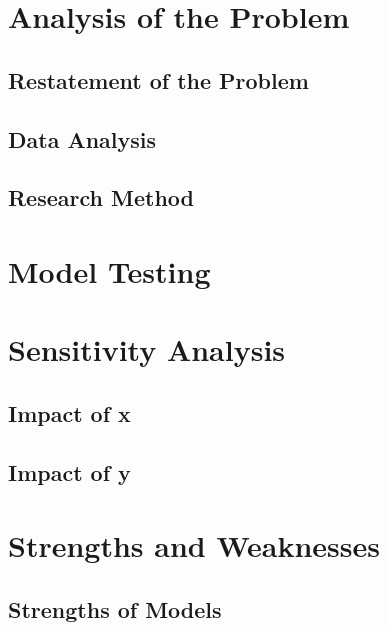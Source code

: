 \documentclass{mcmthesis}
\begin{document}
\section{Analysis of the Problem}
\subsection{Restatement of the Problem}
\subsection{Data Analysis}
\subsection{Research Method}








\section{Model Testing}

\section{Sensitivity Analysis}
\subsection{Impact of x}
\subsection{Impact of y}

\section{Strengths and Weaknesses}
\subsection{Strengths of Models}
\end{document}
